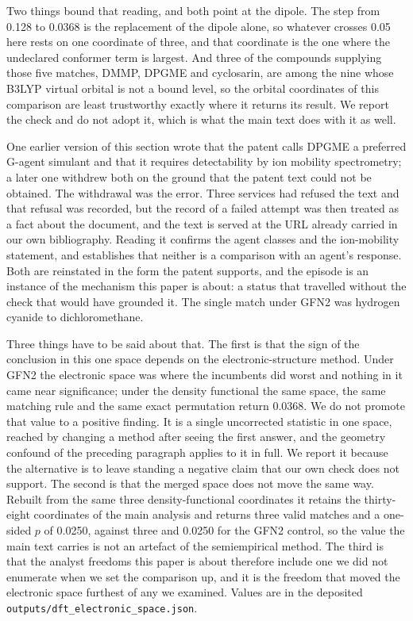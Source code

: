 \documentclass[11pt,a4paper]{article}
\begin{document}
Two things bound that reading, and both point at the dipole. The step from
0.128 to 0.0368 is the replacement of the dipole alone, so whatever crosses
0.05 here rests on one coordinate of three, and that coordinate is the one
where the undeclared conformer term is largest. And three of the compounds
supplying those five matches, DMMP, DPGME and cyclosarin, are among the nine
whose B3LYP virtual orbital is not a bound level, so the orbital coordinates
of this comparison are least trustworthy exactly where it returns its result.
We report the check and do not adopt it, which is what the main text does with
it as well.

One earlier version of this section wrote that the patent calls DPGME a
preferred G-agent simulant and that it requires detectability by ion mobility
spectrometry; a later one withdrew both on the ground that the patent text could
not be obtained. The withdrawal was the error. Three services had refused the
text and that refusal was recorded, but the record of a failed attempt was then
treated as a fact about the document, and the text is served at the URL already
carried in our own bibliography. Reading it confirms the agent classes and the
ion-mobility statement, and establishes that neither is a comparison with an
agent's response. Both are reinstated in the form the patent supports, and the
episode is an instance of the mechanism this paper is about: a status that
travelled without the check that would have grounded it. The single match under
GFN2 was hydrogen cyanide to dichloromethane.

Three things have to be said about that. The first is that the sign of the
conclusion in this one space depends on the electronic-structure method. Under
GFN2 the electronic space was where the incumbents did worst and nothing in it
came near significance; under the density functional the same space, the same
matching rule and the same exact permutation return 0.0368. We do not promote
that value to a positive finding. It is a single uncorrected statistic in one
space, reached by changing a method after seeing the first answer, and the
geometry confound of the preceding paragraph applies to it in full. We report it
because the alternative is to leave standing a negative claim that our own check
does not support. The second is that the merged space does not move the same
way. Rebuilt from the same three density-functional coordinates it retains the
thirty-eight coordinates of the main analysis and returns three valid matches and
a one-sided $p$ of 0.0250, against three and 0.0250 for the GFN2 control, so the
value the main text carries is not an artefact of the semiempirical method. The
third is that the analyst freedoms this paper is about therefore include one we
did not enumerate when we set the comparison up, and it is the freedom that
moved the electronic space furthest of any we examined. Values are in the
deposited \texttt{outputs/dft\_electronic\_space.json}.
\end{document}
